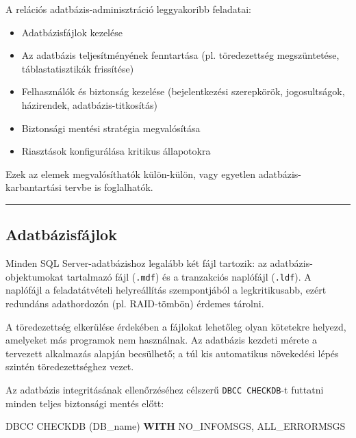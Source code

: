 \documentclass[
  magyar,
]{article}
\newenvironment{Shaded}{}{}
\newcommand{\KeywordTok}[1]{\textcolor[rgb]{0.00,0.44,0.13}{\textbf{#1}}}
\newcommand{\NormalTok}[1]{#1}
\newcommand{\StringTok}[1]{\textcolor[rgb]{0.25,0.44,0.63}{#1}}
\providecommand{\tightlist}{%
  \setlength{\itemsep}{0pt}\setlength{\parskip}{0pt}}
\begin{document}
A relációs adatbázis-adminisztráció leggyakoribb feladatai:

\begin{itemize}
\tightlist
\item
  Adatbázisfájlok kezelése
\item
  Az adatbázis teljesítményének fenntartása (pl. töredezettség
  megszüntetése, táblastatisztikák frissítése)
\item
  Felhasználók és biztonság kezelése (bejelentkezési szerepkörök,
  jogosultságok, házirendek, adatbázis-titkosítás)
\item
  Biztonsági mentési stratégia megvalósítása
\item
  Riasztások konfigurálása kritikus állapotokra
\end{itemize}

Ezek az elemek megvalósíthatók külön-külön, vagy egyetlen
adatbázis-karbantartási tervbe is foglalhatók.

\begin{center}\rule{0.5\linewidth}{0.5pt}\end{center}

\subsection{Adatbázisfájlok}\label{adatbuxe1zisfuxe1jlok}

Minden SQL Server-adatbázishoz legalább két fájl tartozik: az
adatbázis-objektumokat tartalmazó fájl (\texttt{.mdf}) és a tranzakciós
naplófájl (\texttt{.ldf}). A naplófájl a feladatátvételi helyreállítás
szempontjából a legkritikusabb, ezért redundáns adathordozón (pl.
RAID-tömbön) érdemes tárolni.

A töredezettség elkerülése érdekében a fájlokat lehetőleg olyan
kötetekre helyezd, amelyeket más programok nem használnak. Az adatbázis
kezdeti mérete a tervezett alkalmazás alapján becsülhető; a túl kis
automatikus növekedési lépés szintén töredezettséghez vezet.

Az adatbázis integritásának ellenőrzéséhez célszerű
\texttt{DBCC\ CHECKDB}-t futtatni minden teljes biztonsági mentés előtt:

\begin{Shaded}
\begin{Highlighting}[]
\NormalTok{DBCC CHECKDB (}\StringTok{\textquotesingle{}DB\_name\textquotesingle{}}\NormalTok{) }\KeywordTok{WITH}\NormalTok{ NO\_INFOMSGS, ALL\_ERRORMSGS}
\end{Highlighting}
\end{Shaded}
\end{document}
